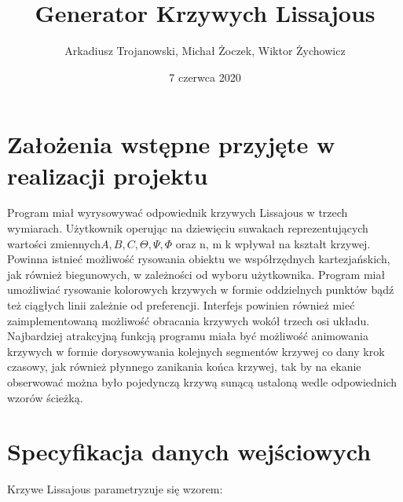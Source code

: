 


\title{
\huge {Generator Krzywych Lissajous} \\
}

\author{Arkadiusz Trojanowski, Michał Żoczek, Wiktor Żychowicz}
\date{7 czerwca 2020}
\maketitle
\section{Założenia wstępne przyjęte w realizacji projektu}
	Program miał wyrysowywać odpowiednik krzywych Lissajous w trzech wymiarach. Użytkownik operując na dziewięciu suwakach reprezentujących wartości zmiennych$ A, B, C, \Theta, \Psi, \Phi$ oraz n, m k wpływał na kształt krzywej. Powinna istnieć możliwość rysowania obiektu we współrzędnych kartezjańskich, jak również biegunowych, w zależności od wyboru użytkownika. Program miał umożliwiać rysowanie kolorowych krzywych w formie oddzielnych punktów bądź też ciągłych linii zależnie od preferencji. Interfejs powinien również mieć zaimplementowaną możliwość obracania krzywych wokół trzech osi układu. Najbardziej atrakcyjną funkcją programu miała być możliwość animowania krzywych w formie dorysowywania kolejnych segmentów krzywej co dany krok czasowy, jak również płynnego zanikania końca krzywej, tak by na ekanie obserwować można było pojedynczą krzywą sunącą ustaloną wedle odpowiednich wzorów ścieżką.
	
\section{Specyfikacja danych wejściowych}
Krzywe Lissajous parametryzuje się wzorem:

